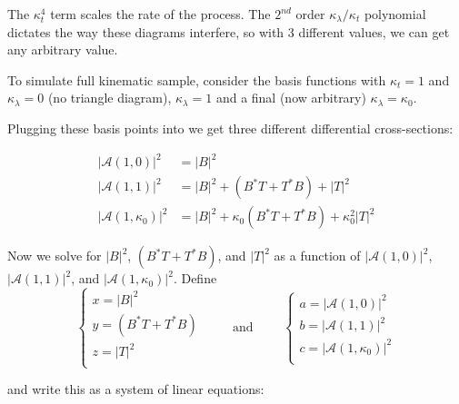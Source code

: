 The $\kappa_t^4$ term scales the rate of the process. The $2^{nd}$ order $\kappa_\lambda / \kappa_t $ polynomial dictates the way these diagrams interfere, so with 3 different \kl values, we can get any arbitrary \kl value.

\def\ko{\kappa_0}
To simulate full kinematic sample, consider the basis functions with $\kappa_t = 1$ and $\kappa_\lambda = 0$ (no triangle diagram), $\kappa_\lambda =1$ and a final (now arbitrary) $\kappa_\lambda = \kappa_0$.
 
Plugging these basis points into \Eq{\ref{eq:xsec-kl-kt}} we get three different differential cross-sections:
 
\begin{align}
|\mathcal{A}(1,0)|^2 &= |B|^2 \\
|\mathcal{A}(1,1)|^2 &= |B|^2 +  (B^* T + T^* B)  + |T|^2  \\
|\mathcal{A}(1,\ko)|^2 &= |B|^2 +  \ko (B^* T + T^* B)  + \ko^2 |T|^2 
\label{eq:xec-arb}
\end{align}

\def\a{|\mathcal{A}(1,0)|^2}
\def\b{|\mathcal{A}(1,1)|^2}
\def\c{|\mathcal{A}(1,\ko)|^2}

\def\x{|B|^2} 
\def\y{(B^* T + T^* B) }
\def\z{|T|^2}

Now we solve for $\x$, $\y$, and $\z$ as a function of $\a$, $\b$, and $\c$.
Define 
\begin{equation}
\begin{cases}
x = \x \\
y = \y \\
z = \z \\
\end{cases}
\qquad \text{ and } \qquad
\begin{cases}
a = \a \\
b = \b \\
c = \c \\
\end{cases}
\end{equation}

and write this as a system of linear equations: 

